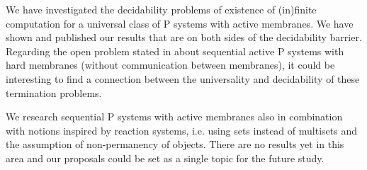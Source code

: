 We have investigated the decidability problems of existence of (in)finite computation for a universal class of P systems with active membranes. We have shown and published our results that are on both sides of the decidability barrier. Regarding the open problem stated in \cite{Ibarra05Active} about sequential active P systems with hard membranes (without communication between membranes), it could be interesting to find a connection between the universality and decidability of these termination problems.

We research sequential P systems with active membranes also in combination with notions inspired by reaction systems, i.e. using sets instead of multisets and the assumption of non-permanency of objects. There are no results yet in this area and our proposals could be set as a single topic for the future study.

